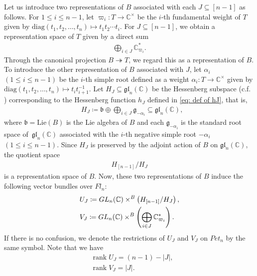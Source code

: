 \documentclass[11pt]{article}
\theoremstyle{definition}
\numberwithin{equation}{section}
\numberwithin{equation}{section}
\DeclareMathOperator{\rank}{rank}
\begin{document}
Let us introduce two representations of $B$ associated with each $J\subseteq [n-1]$ as follows. For $1\le i\le n-1$, let $\varpi_i\colon T\rightarrow {\mathbb C}^{\times}$ be the $i$-th fundamental weight of $T$ given by $\text{diag}(t_1,t_2,\ldots,t_n)\mapsto t_1t_2\cdots t_i$. For $J\subseteq [n-1]$, we obtain a representation space of $T$ given by a direct sum
\begin{align*}
\bigoplus_{i\in J} {\mathbb C}_{\varpi_i}^*.
\end{align*}
Through the canonical projection $B\twoheadrightarrow T$, we regard this as a representation of $B$. To introduce the other representation of $B$ associated with $J$, 
let $\alpha_i$ $(1\le i\le n-1)$ be the $i$-th simple root defined as a weight $\alpha_i\colon T\rightarrow {\mathbb C}^{\times}$ given by $\text{diag}(t_1,t_2,\ldots,t_n)\mapsto t_{i}t_{i+1}^{-1}$. Let $H_J\subseteq \mathfrak{gl}_n({\mathbb C})$ be the Hessenberg subspace (c.f. \cite[Sect.~2]{ty}) corresponding to the Hessenberg function $h_J$ defined in \eqref{eq: def of hJ}, that is,
\begin{align}\label{eq: HJ}
&H_{J} \coloneqq \mathfrak{b}\oplus\bigoplus_{i\in J} \mathfrak{g}_{-\alpha_i} \subseteq \mathfrak{gl}_n({\mathbb C}),
\end{align}
where $\mathfrak{b}=\text{Lie}(B)$ is the Lie algebra of $B$ and each $\mathfrak{g}_{-\alpha_{i}}$ is the standard root space of~$\mathfrak{gl}_n({\mathbb C})$ associated with the $i$-th negative simple root $-\alpha_i$ $(1\le i\le n-1)$. Since $H_J$ is preserved by the adjoint action of $B$ on $\mathfrak{gl}_n({\mathbb C})$, the quotient space
\begin{align*}
H_{[n-1]}/H_J
\end{align*}
is a representation space of $B$. Now, these two representations of $B$ induce the following vector bundles over $Fl_n$: 
\begin{align*}
&U_{J} 
\coloneqq {\rm GL}_n({\mathbb C})\times^B \left(H_{[n-1]}/H_J\right), \\
&V_{J} 
\coloneqq {\rm GL}_n({\mathbb C})\times^B \left(\bigoplus_{i\in J} {\mathbb C}_{\varpi_i}^*\right).
\end{align*}
If there is no confusion, we denote the restrictions of $U_{J}$ and $V_{J}$ on $Pet_{n}$ by the same symbol. Note that we have
\begin{equation}
\begin{split}\label{eq: rank of U and J}
&\rank U_{J}=(n-1)-|J|, \\
&\rank V_{J}=|J|.
\end{split}
\end{equation}
\end{document}
